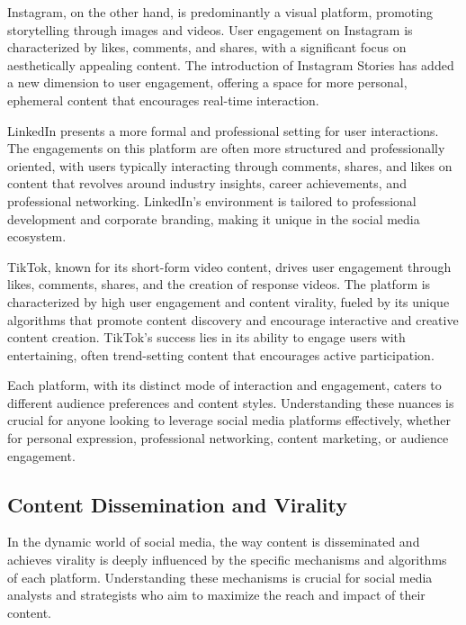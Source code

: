 \documentclass[
]{book}
\begin{document}
Instagram, on the other hand, is predominantly a visual platform, promoting storytelling through images and videos. User engagement on Instagram is characterized by likes, comments, and shares, with a significant focus on aesthetically appealing content. The introduction of Instagram Stories has added a new dimension to user engagement, offering a space for more personal, ephemeral content that encourages real-time interaction.

LinkedIn presents a more formal and professional setting for user interactions. The engagements on this platform are often more structured and professionally oriented, with users typically interacting through comments, shares, and likes on content that revolves around industry insights, career achievements, and professional networking. LinkedIn's environment is tailored to professional development and corporate branding, making it unique in the social media ecosystem.

TikTok, known for its short-form video content, drives user engagement through likes, comments, shares, and the creation of response videos. The platform is characterized by high user engagement and content virality, fueled by its unique algorithms that promote content discovery and encourage interactive and creative content creation. TikTok's success lies in its ability to engage users with entertaining, often trend-setting content that encourages active participation.

Each platform, with its distinct mode of interaction and engagement, caters to different audience preferences and content styles. Understanding these nuances is crucial for anyone looking to leverage social media platforms effectively, whether for personal expression, professional networking, content marketing, or audience engagement.

\hypertarget{content-dissemination-and-virality}{%
\subsection*{Content Dissemination and Virality}\label{content-dissemination-and-virality}}

In the dynamic world of social media, the way content is disseminated and achieves virality is deeply influenced by the specific mechanisms and algorithms of each platform. Understanding these mechanisms is crucial for social media analysts and strategists who aim to maximize the reach and impact of their content.
\end{document}
